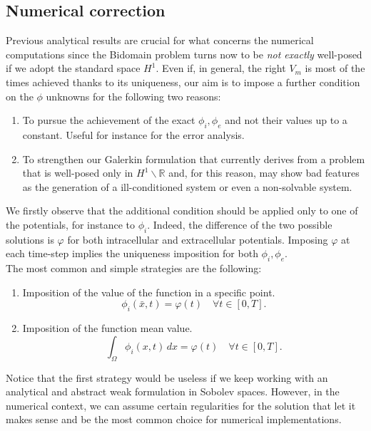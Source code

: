 \documentclass[a4paper,11pt]{article}
\begin{document}
\subsection{Numerical correction} \label{imposition_section}
Previous analytical results are crucial for what concerns the numerical computations since the Bidomain problem turns now to be \emph{not exactly} well-posed if we adopt the standard space $H^1$. Even if, in general, the right $V_m$ is most of the times achieved thanks to its uniqueness, our aim is to impose a further condition on the $\phi$ unknowns for the following two reasons:
\begin{enumerate}
	\item To pursue the achievement of the exact $\phi_i,\phi_e$ and not their values up to a constant. Useful for instance for the error analysis.
	\item To strengthen our Galerkin formulation that currently derives from a problem that is well-posed only in $H^1\backslash \mathbb{R}$ and, for this reason, may show bad features as the generation of a ill-conditioned system or even a non-solvable system.
\end{enumerate}

\vspace{3mm}
\noindent We firstly observe that the additional condition should be applied only to one of the potentials, for instance to $\phi_i$. Indeed, the difference of the two possible solutions is $\varphi$ for both intracellular and extracellular potentials. Imposing $\varphi$ at each time-step implies the uniqueness imposition for both $\phi_i,\phi_e$. \\

\noindent The most common and simple strategies are the following:
\begin{enumerate}
	\item Imposition of the value of the function in a specific point.
	\begin{equation*}
	\phi_i(\bar{x},t) = \varphi(t) \quad \forall t \in [0,T].
	\end{equation*}
	\item Imposition of the function mean value.
	\begin{equation*}
	\int_\Omega \phi_i(x,t)\,dx = \varphi(t) \quad \forall t \in [0,T].
	\end{equation*}
\end{enumerate}

\noindent Notice that the first strategy would be useless if we keep working with an analytical and abstract weak formulation in Sobolev spaces. However, in the numerical context, we can assume certain regularities for the solution that let it makes sense and be the most common choice for numerical implementations. \\
\end{document}
